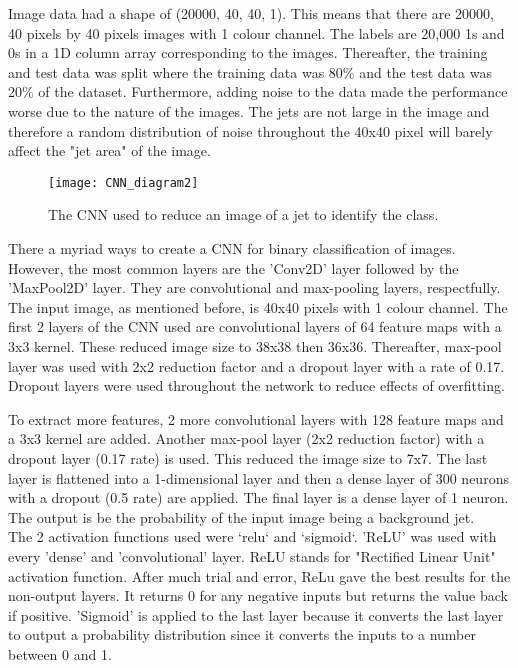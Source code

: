 \documentclass[11pt, a4page]{article}
\begin{document}
Image data had a shape of (20000, 40, 40, 1). This means that there are 20000, 40 pixels by 40 pixels images with 1 colour channel. The labels are 20,000 1s and 0s in a 1D column array corresponding to the images. Thereafter, the training and test data was split where the training data was $80\%$ and the test data was $20\%$ of the dataset. Furthermore, adding noise to the data made the performance worse due to the nature of the images. The jets are not large in the image and therefore a random distribution of noise throughout the 40x40 pixel will barely affect the "jet area" of the image.




\begin{figure}[!ht]
    \centering
    \texttt{[image: CNN\_diagram2]}
    \caption{The CNN used to reduce an image of a jet to identify the class. }
    \label{nothing}
\end{figure}

There a myriad ways to create a CNN for binary classification of images. However, the most common  layers are the 'Conv2D' layer followed by the 'MaxPool2D' layer. They are convolutional and max-pooling layers, respectfully. The input image, as mentioned before, is 40x40 pixels with 1 colour channel. The first 2 layers of the CNN used are convolutional layers of 64 feature maps with a 3x3 kernel. These reduced image size to 38x38 then 36x36. Thereafter, max-pool layer was used with 2x2 reduction factor and a dropout layer with a rate of 0.17. Dropout layers were used throughout the network to reduce effects of overfitting. 

To extract more features, 2 more convolutional layers with 128 feature maps and a 3x3 kernel are added. Another max-pool layer (2x2 reduction factor) with a dropout layer (0.17 rate) is used. This reduced the image size to 7x7. The last layer is flattened into a 1-dimensional layer and then a dense layer of 300 neurons with a dropout (0.5 rate) are applied. The final layer is a dense layer of 1 neuron. The output is be the probability of the input image being a background jet.\\

The 2 activation functions used were `relu` and `sigmoid`. 'ReLU' was used with every 'dense' and 'convolutional' layer. ReLU stands for "Rectified Linear Unit" activation function. After much trial and error, ReLu gave the best results for the non-output layers. It returns 0 for any negative inputs but returns the value back if positive. 'Sigmoid' is applied to the last layer because it converts the last layer to output a probability distribution since it converts the inputs to a number between 0 and 1.\\
\end{document}
